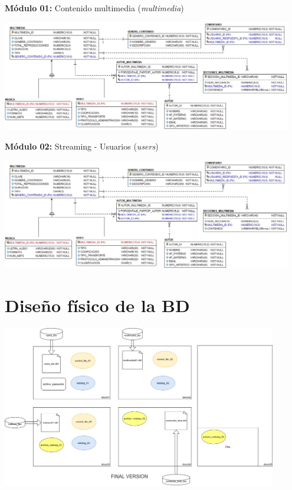 \documentclass{article}
\begin{document}
\textbf{Módulo 01:} Contenido multimedia (\textit{multimedia})

\begin{center}
\includegraphics[width=0.95\textwidth]{media-stream-modulo-01}
\end{center}

\textbf{Módulo 02:} Streaming - Usuarios (\textit{users})

\begin{center}
\includegraphics[width=0.95\textwidth]{media-stream-modulo-01}
\end{center}

\section{Diseño físico de la BD}

\includegraphics[width=0.9\textwidth]{arquitectura-bd-mediastream.png}
\end{document}
